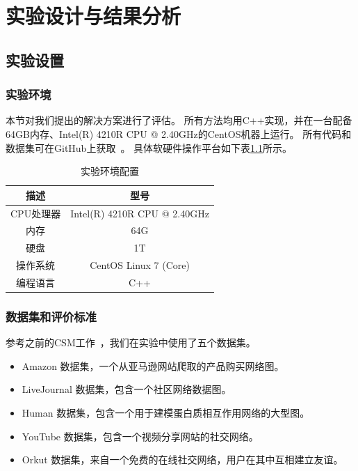 \def\itk{KiSD}
\def\pm{PBSM}
\chapter{实验设计与结果分析}
\label{ch5:experiment}
\section{实验设置}
\subsection{实验环境}
本节对我们提出的解决方案进行了评估。
所有方法均用C++实现，并在一台配备64GB内存、Intel(R) 4210R CPU @ 2.40GHz的CentOS机器上运行。
所有代码和数据集可在GitHub上获取~\cite{code-git-csmtok}。
具体软硬件操作平台如下表\ref{table:setup}所示。
\begin{table}[H]
    \centering
    \caption{实验环境配置}
    \label{table:setup}
    \begin{tabular}{cc}
        \toprule
        描述   & 型号  \\
        \midrule
        CPU处理器 & Intel(R) 4210R CPU @ 2.40GHz\\
        内存 & 64G \\
        硬盘 & 1T\\
        操作系统 & CentOS Linux 7 (Core)\\
        编程语言 & C++ \\
        \bottomrule
    \end{tabular}
\end{table}

\subsection{数据集和评价标准}
\label{ss-sec:dataset}
参考之前的CSM工作~\cite{csm-survey:DBLP:journals/pvldb/SunSLH22,static-sm:DBLP:conf/sigmod/Sun020}，我们在实验中使用了五个数据集。
\begin{itemize}
\item Amazon 数据集，一个从亚马逊网站爬取的产品购买网络图。
\item LiveJournal 数据集，包含一个社区网络数据图。
\item Human 数据集，包含一个用于建模蛋白质相互作用网络的大型图。
\item YouTube 数据集，包含一个视频分享网站的社交网络。
\item Orkut 数据集，来自一个免费的在线社交网络，用户在其中互相建立友谊。
\end{itemize}   

